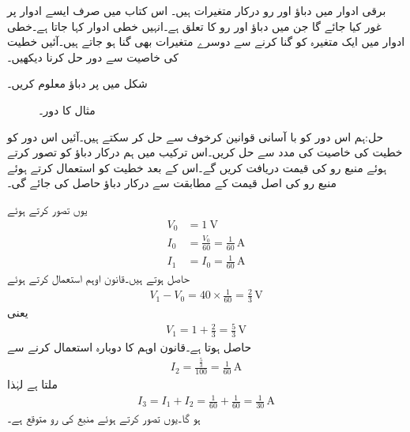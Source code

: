 برقی ادوار میں دباؤ اور رو درکار متغیرات ہیں۔ اس کتاب میں صرف ایسے ادوار پر غور کیا جائے گا جن میں دباؤ اور رو کا تعلق  ہے۔انہیں خطی ادوار کہا جاتا ہے۔خطی ادوار میں ایک متغیرہ کو  گنا کرنے سے دوسرے متغیرات بھی  گنا ہو جاتے ہیں۔آئیں خطیت کی خاصیت سے دور حل کرنا دیکھیں۔

شکل  میں  پر دباؤ معلوم کریں۔
\begin{figure}
\centering
{}
\caption{مثال  کا دور۔}
\label{شکل_مسئلہ_خطیت_دور_حل}
\end{figure}

حل:ہم اس دور کو با آسانی قوانین کرخوف سے حل کر سکتے ہیں۔آئیں اس دور کو خطیت کی خاصیت  کی مدد سے حل کریں۔اس ترکیب میں ہم درکار دباؤ کو  تصور کرتے ہوئے منبع رو کی قیمت دریافت کریں گے۔اس کے بعد خطیت کو استعمال کرتے ہوئے منبع رو کی اصل قیمت کے مطابقت سے درکار دباؤ حاصل کی جائے گی۔

یوں  تصور کرتے ہوئے 
\begin{align*}
V_0&=\SI{1}{\volt}\\
I_0&=\frac{V_0}{60}=\frac{1}{60} \, \si{\ampere}\\
I_1&=I_0=\frac{1}{60} \,\si{\ampere}
\end{align*}
حاصل ہوتے ہیں۔قانون اوہم استعمال کرتے ہوئے
\begin{align*}
V_1-V_0=40 \times \frac{1}{60}=\frac{2}{3} \, \si{\volt}
\end{align*}
یعنی
\begin{align*}
V_1=1+\frac{2}{3}=\frac{5}{3}\,\si{\volt}
\end{align*}
حاصل ہوتا ہے۔قانون اوہم کا دوبارہ استعمال کرنے سے
\begin{align*}
I_2=\frac{\frac{5}{3}}{100}=\frac{1}{60} \, \si{\ampere}
\end{align*}
ملتا ہے لہٰذا
\begin{align*}
I_3=I_1+I_2=\frac{1}{60} +\frac{1}{60}=\frac{1}{30}\,\si{\ampere}
\end{align*}
ہو گا۔یوں  تصور کرتے ہوئے منبع کی رو  متوقع ہے۔

